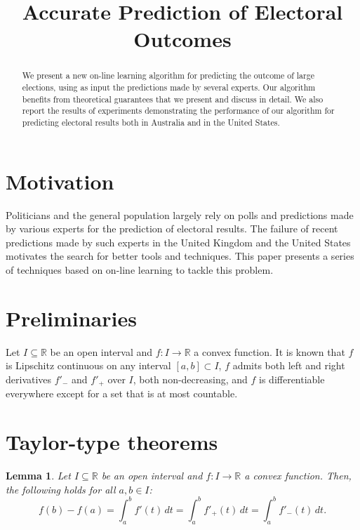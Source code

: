 \documentclass[12pt]{amsart}
\title[Election Outcomes]
{Accurate Prediction of Electoral Outcomes}
\def\Rset{\mathbb{R}}
\newcommand{\0}{\mat{0}}
\newcommand{\1}{\mathds{1}}
\newtheorem{lemma}[theorem]{Lemma}
\begin{document}
\begin{abstract}
  We present a new on-line learning algorithm for predicting the
  outcome of large elections, using as input the predictions made by
  several experts. Our algorithm benefits from theoretical guarantees
  that we present and discuss in detail. We also report the results of
  experiments demonstrating the performance of our algorithm for
  predicting electoral results both in Australia and in the United
  States.

\end{abstract}

\maketitle

\section{Motivation}

Politicians and the general population largely rely on polls and
predictions made by various experts for the prediction of electoral
results.  The failure of recent predictions made by such experts in
the United Kingdom and the United States motivates the search for
better tools and techniques. This paper presents a series of
techniques based on on-line learning to tackle this problem.


\section{Preliminaries} 
\label{sec:preliminaries}

Let $I \subseteq \Rset$ be an open interval and $f\colon I \to \Rset$
a convex function. It is known that $f$ is Lipschitz continuous on any
interval $[a, b] \subset I$, $f$ admits both left and right
derivatives $f'_-$ and $f'_+$ over $I$, both non-decreasing, and 
$f$ is differentiable everywhere except for a set that is at most
countable.

\section{Taylor-type theorems}



\begin{lemma}
\label{lemma:absolute}
Let $I \subseteq \Rset$ be an open interval and $f\colon I \to \Rset$
a convex function. Then, the following holds for all $a, b \in I$:
\begin{equation*}
f(b) - f(a) = \int_a^b f'(t)\, dt = \int_a^b f'_+(t)\, dt = \int_a^b f'_-(t)\, dt.
\end{equation*}
\end{lemma}
\end{document}
